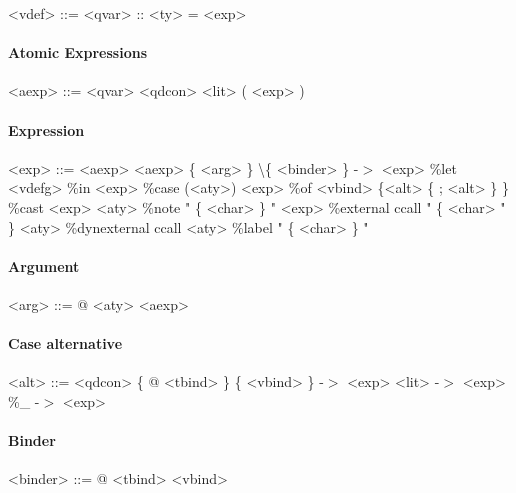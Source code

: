 \begin{scriptsize}
\begin{grammar}
<vdef> ::= <qvar> :: <ty> = <exp>
\end{grammar}

\paragraph{Atomic Expressions}

\begin{grammar}
<aexp> ::= <qvar>
      \alt <qdcon>
      \alt <lit>
      \alt ( <exp> )
\end{grammar}

\paragraph{Expression}

\begin{grammar}
<exp> ::= <aexp>
     \alt <aexp> \{ <arg> \}
     \alt \textbackslash \{ <binder> \} -$>$ <exp>
     \alt \%let <vdefg> \%in <exp>
     \alt \%case (<aty>) <exp> \%of <vbind> \{<alt> \{ ; <alt> \}  \}
     \alt \%cast <exp> <aty>
     \alt \%note " \{ <char> \} " <exp>
     \alt \%external ccall " \{ <char> " \} <aty>
     \alt \%dynexternal ccall <aty>
     \alt \%label " \{ <char> \} "
\end{grammar}

\paragraph{Argument}

\begin{grammar}
<arg> ::= @ <aty>
     \alt <aexp>
\end{grammar}

\paragraph{Case alternative}

\begin{grammar}
<alt> ::= <qdcon> \{ @ <tbind> \} \{ <vbind> \} -$>$ <exp>
     \alt <lit> -$>$ <exp>
     \alt \%\_ -$>$ <exp>
\end{grammar}

\paragraph{Binder}

\begin{grammar}
<binder> ::= @ <tbind>
        \alt <vbind>
\end{grammar}


\end{scriptsize}
